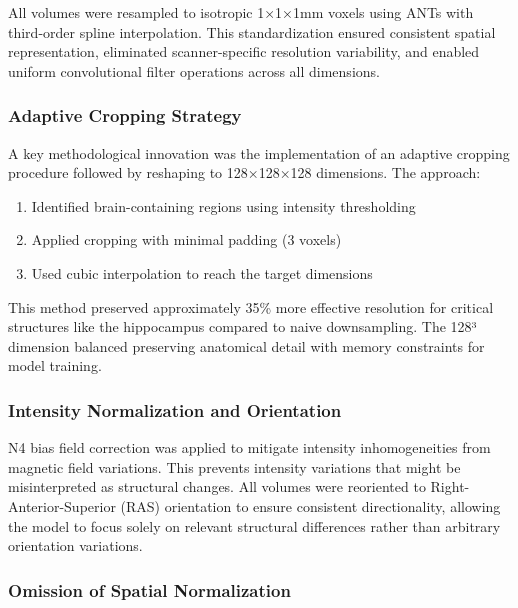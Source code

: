 \documentclass[12pt, a4paper]{article}
\begin{document}
All volumes were resampled to isotropic 1×1×1mm voxels using ANTs with third-order spline interpolation. This standardization ensured consistent spatial representation, eliminated scanner-specific resolution variability, and enabled uniform convolutional filter operations across all dimensions.

\subsubsection{Adaptive Cropping Strategy}

A key methodological innovation was the implementation of an adaptive cropping procedure followed by reshaping to 128×128×128 dimensions. The approach:

\begin{enumerate}
    \item Identified brain-containing regions using intensity thresholding
    \item Applied cropping with minimal padding (3 voxels)
    \item Used cubic interpolation to reach the target dimensions
\end{enumerate}

This method preserved approximately 35\% more effective resolution for critical structures like the hippocampus compared to naive downsampling. The 128³ dimension balanced preserving anatomical detail with memory constraints for model training.

\subsubsection{Intensity Normalization and Orientation}

N4 bias field correction was applied to mitigate intensity inhomogeneities from magnetic field variations. This prevents intensity variations that might be misinterpreted as structural changes. All volumes were reoriented to Right-Anterior-Superior (RAS) orientation to ensure consistent directionality, allowing the model to focus solely on relevant structural differences rather than arbitrary orientation variations.

\subsubsection{Omission of Spatial Normalization}
\end{document}

